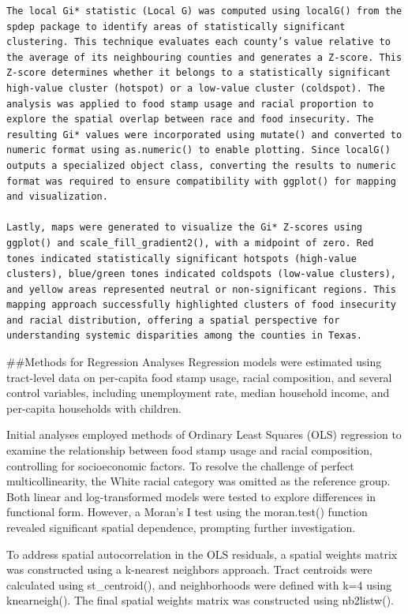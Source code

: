 \documentclass[
]{article}
\begin{document}
\begin{verbatim}
The local Gi* statistic (Local G) was computed using localG() from the spdep package to identify areas of statistically significant clustering. This technique evaluates each county’s value relative to the average of its neighbouring counties and generates a Z-score. This Z-score determines whether it belongs to a statistically significant high-value cluster (hotspot) or a low-value cluster (coldspot). The analysis was applied to food stamp usage and racial proportion to explore the spatial overlap between race and food insecurity. The resulting Gi* values were incorporated using mutate() and converted to numeric format using as.numeric() to enable plotting. Since localG() outputs a specialized object class, converting the results to numeric format was required to ensure compatibility with ggplot() for mapping and visualization.

Lastly, maps were generated to visualize the Gi* Z-scores using ggplot() and scale_fill_gradient2(), with a midpoint of zero. Red tones indicated statistically significant hotspots (high-value clusters), blue/green tones indicated coldspots (low-value clusters), and yellow areas represented neutral or non-significant regions. This mapping approach successfully highlighted clusters of food insecurity and racial distribution, offering a spatial perspective for understanding systemic disparities among the counties in Texas. 
\end{verbatim}

\#\#Methods for Regression Analyses Regression models were estimated
using tract-level data on per-capita food stamp usage, racial
composition, and several control variables, including unemployment rate,
median household income, and per-capita households with children.

Initial analyses employed methods of Ordinary Least Squares (OLS)
regression to examine the relationship between food stamp usage and
racial composition, controlling for socioeconomic factors. To resolve
the challenge of perfect multicollinearity, the White racial category
was omitted as the reference group. Both linear and log-transformed
models were tested to explore differences in functional form. However, a
Moran's I test using the moran.test() function revealed significant
spatial dependence, prompting further investigation.

To address spatial autocorrelation in the OLS residuals, a spatial
weights matrix was constructed using a k-nearest neighbors approach.
Tract centroids were calculated using st\_centroid(), and neighborhoods
were defined with k=4 using knearneigh(). The final spatial weights
matrix was constructed using nb2listw().
\end{document}
